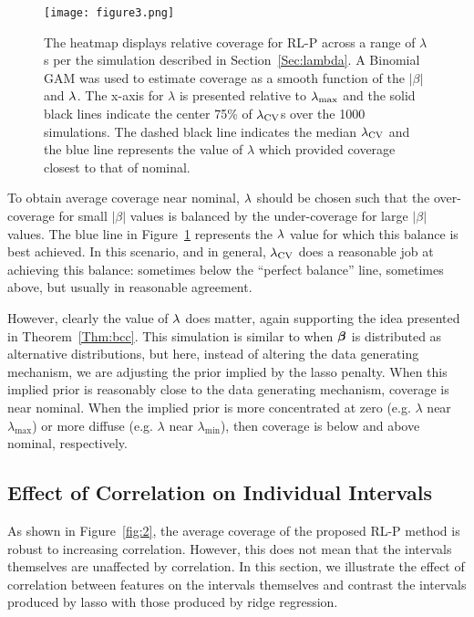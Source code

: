 \begin{figure}[htb!]
  \begin{center}
    \texttt{[image: figure3.png]}
    \caption{\label{fig:3} The heatmap displays relative coverage for RL-P across a range of $\lambda$s per the simulation described in Section~\ref{Sec:lambda}. A Binomial GAM was used to estimate coverage as a smooth function of the $|\beta|$ and $\lambda$. The x-axis for $\lambda$ is presented relative to $\lambda_{\max}$ and the solid black lines indicate the center 75\% of $\lambda_{\textrm{CV}}$s over the 1000 simulations. The dashed black line indicates the median $\lambda_{\textrm{CV}}$ and the blue line represents the value of $\lambda$ which provided coverage closest to that of nominal.}
  \end{center}
\end{figure}

To obtain average coverage near nominal, $\lambda$ should be chosen such that the over-coverage for small $|\beta|$ values is balanced by the under-coverage for large $|\beta|$ values. The blue line in Figure~\ref{fig:3} represents the $\lambda$ value for which this balance is best achieved. In this scenario, and in general, $\lambda_{\textrm{CV}}$ does a reasonable job at achieving this balance: sometimes below the ``perfect balance'' line, sometimes above, but usually in reasonable agreement.

However, clearly the value of $\lambda$ does matter, again supporting the idea presented in Theorem~\ref{Thm:bcc}. This simulation is similar to when $\boldsymbol{\beta}$ is distributed as alternative distributions, but here, instead of altering the data generating mechanism, we are adjusting the prior implied by the lasso penalty. When this implied prior is reasonably close to the data generating mechanism, coverage is near nominal. When the implied prior is more concentrated at zero (e.g. $\lambda$ near $\lambda_{\max}$) or more diffuse (e.g. $\lambda$ near $\lambda_{\min}$), then coverage is below and above nominal, respectively.

\subsection{Effect of Correlation on Individual Intervals} \label{Sec:Ridge}

As shown in Figure~\ref{fig:2}, the average coverage of the proposed RL-P method is robust to increasing correlation. However, this does not mean that the intervals themselves are unaffected by correlation. In this section, we illustrate the effect of correlation between features on the intervals themselves and contrast the intervals produced by lasso with those produced by ridge regression.


